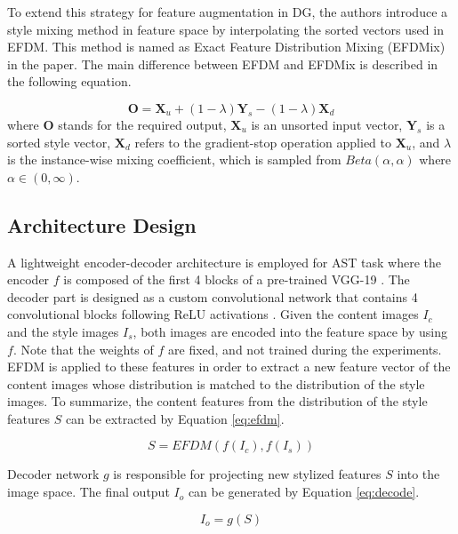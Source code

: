To extend this strategy for feature augmentation in DG, the authors introduce a style mixing method in feature space by interpolating the sorted vectors used in EFDM. This method is named as Exact Feature Distribution Mixing (EFDMix) in the paper. The main difference between EFDM and EFDMix is described in the following equation.

\begin{equation}
    \mathbf{O} = \mathbf{X}_{u} + (1-\lambda)\mathbf{Y}_{s} - (1-\lambda)\mathbf{X}_{d}
    \label{eq:efdmix}
\end{equation}
where $\mathbf{O}$ stands for the required output, $\mathbf{X}_{u}$ is an unsorted input vector, $\mathbf{Y}_{s}$ is a sorted style vector, $\mathbf{X}_{d}$ refers to the gradient-stop operation applied to $\mathbf{X}_{u}$, and $\lambda$ is the instance-wise mixing coefficient, which is sampled from $Beta(\alpha,\alpha)$ where $\alpha \in (0, \infty)$.

\subsection{Architecture Design}

A lightweight encoder-decoder architecture is employed for AST task where the encoder $f$ is composed of the first 4 blocks of a pre-trained VGG-19 \cite{simonyan2014very}. The decoder part is designed as a custom convolutional network that contains 4 convolutional blocks following ReLU activations \cite{maas2013rectifier}. Given the content images $I_{c}$ and the style images $I_{s}$, both images are encoded into the feature space by using $f$. Note that the weights of $f$ are fixed, and not trained during the experiments. EFDM is applied to these features in order to extract a new feature vector of the content images whose distribution is matched to the distribution of the style images. To summarize, the content features from the distribution of the style features $S$ can be extracted by Equation \ref{eq:efdm}.

\begin{equation}
    S = EFDM(f(I_{c}), f(I_{s}))
    \label{eq:efdm}
\end{equation}

Decoder network $g$ is responsible for projecting new stylized features $S$ into the image space. The final output $I_{o}$ can be generated by Equation \ref{eq:decode}.

\begin{equation}
    I_{o} = g(S)
    \label{eq:decode}
\end{equation}

